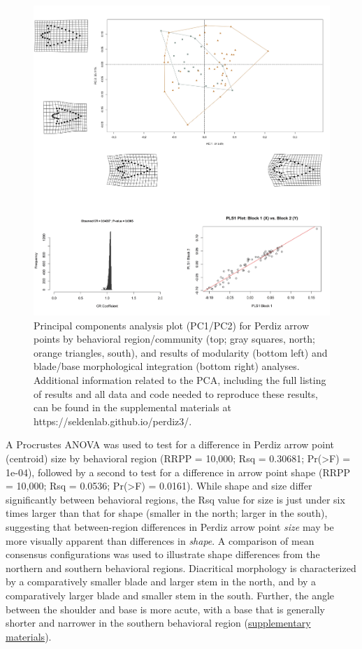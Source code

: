 \documentclass[smallextended]{svjour3}       %
\begin{document}
\begin{figure}
\includegraphics[width=1\linewidth]{ms-figs/figure4} \caption{Principal components analysis plot (PC1/PC2) for Perdiz arrow points by behavioral region/community (top; gray squares, north; orange triangles, south), and results of modularity (bottom left) and blade/base morphological integration (bottom right) analyses. Additional information related to the PCA, including the full listing of results and all data and code needed to reproduce these results, can be found in the supplemental materials at https://seldenlab.github.io/perdiz3/.}\label{fig:fig4}
\end{figure}

A Procrustes ANOVA was used to test for a difference in Perdiz arrow
point (centroid) size by behavioral region (RRPP = 10,000; Rsq =
0.30681; Pr(\textgreater F) = 1e-04), followed by a second to test for a
difference in arrow point shape (RRPP = 10,000; Rsq = 0.0536;
Pr(\textgreater F) = 0.0161). While shape and size differ significantly
between behavioral regions, the Rsq value for size is just under six
times larger than that for shape (smaller in the north; larger in the
south), suggesting that between-region differences in Perdiz arrow point
\emph{size} may be more visually apparent than differences in
\emph{shape}. A comparison of mean consensus configurations was used to
illustrate shape differences from the northern and southern behavioral
regions. Diacritical morphology is characterized by a comparatively
smaller blade and larger stem in the north, and by a comparatively
larger blade and smaller stem in the south. Further, the angle between
the shoulder and base is more acute, with a base that is generally
shorter and narrower in the southern behavioral region
(\href{https://seldenlab.github.io/perdiz3/}{supplementary materials}).
\end{document}
